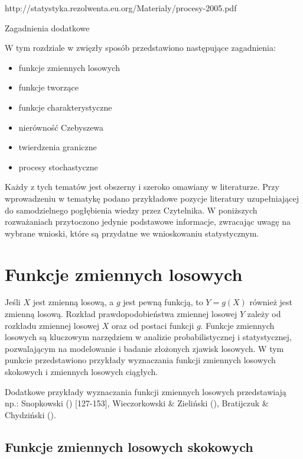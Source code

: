 \documentclass[
  letterpaper,
  DIV=11,
  numbers=noendperiod]{scrreprt}
\begin{document}
http://statystyka.rezolwenta.eu.org/Materialy/procesy-2005.pdf

Zagadnienia dodatkowe

W tym rozdziale w zwięzły sposób przedstawiono następujące zagadnienia:

\begin{itemize}
\item
  funkcje zmiennych losowych
\item
  funkcje tworzące
\item
  funkcje charakterystyczne
\item
  nierówność Czebyszewa
\item
  twierdzenia graniczne
\item
  procesy stochastyczne
\end{itemize}

Każdy z tych tematów jest obszerny i szeroko omawiany w literaturze.
Przy wprowadzeniu w tematykę podano przykładowe pozycje literatury
uzupełniającej do samodzielnego pogłębienia wiedzy przez Czytelnika. W
poniższych rozważaniach przytoczono jedynie podstawowe informacje,
zwracając uwagę na wybrane wnioski, które są przydatne we wnioskowaniu
statystycznym.

\section{Funkcje zmiennych losowych}\label{funkcje-zmiennych-losowych}

Jeśli \(X\) jest zmienną losową, a \(g\) jest pewną funkcją, to
\(Y = g(X)\) również jest zmienną losową. Rozkład prawdopodobieństwa
zmiennej losowej \(Y\) zależy od rozkładu zmiennej losowej \(X\) oraz od
postaci funkcji \(g\). Funkcje zmiennych losowych są kluczowym
narzędziem w analizie probabilistycznej i statystycznej, pozwalającym na
modelowanie i badanie złożonych zjawisk losowych. W tym punkcie
przedstawiono przykłady wyznaczania funkcji zmiennych losowych skokowych
i zmiennych losowych ciągłych.

Dodatkowe przykłady wyznaczania funkcji zmiennych losowych przedstawiają
np.: Snopkowski () {[}127-153{]},
Wieczorkowski \& Zieliński (), Bratijczuk \& Chydziński ().

\subsection{Funkcje zmiennych losowych
skokowych}\label{funkcje-zmiennych-losowych-skokowych}
\end{document}
